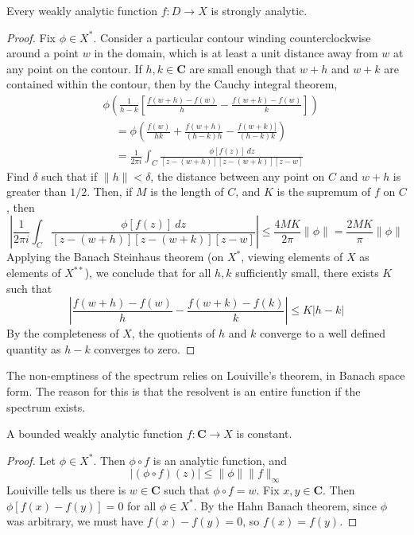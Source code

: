 \begin{theorem}
    Every weakly analytic function $f: D \to X$ is strongly analytic.
\end{theorem}
\begin{proof}
    Fix $\phi \in X^*$. Consider a particular contour winding counterclockwise around a point $w$ in the domain, which is at least a unit distance away from $w$ at any point on the contour. If $h,k \in \mathbf{C}$ are small enough that $w + h$ and $w + k$ are contained within the contour, then by the Cauchy integral theorem,
    \begin{align*}
        &\phi\left( \frac{1}{h-k} \left[ \frac{f(w + h) - f(w)}{h} - \frac{f(w + k) - f(w)}{k} \right] \right)\\
        &\ \ \ \ \ =  \phi \left( \frac{f(w)}{hk} + \frac{f(w + h)}{(h - k)h} - \frac{f(w + k)]}{(h - k)k} \right)\\
        &\ \ \ \ \ = \frac{1}{2\pi i} \int_C \frac{\phi[f(z)]\ dz}{[z - (w + h)][z - (w + k)][z - w]}
    \end{align*}
    Find $\delta$ such that if $\| h \| < \delta$, the distance between any point on $C$ and $w + h$ is greater than $1/2$. Then, if $M$ is the length of $C$, and $K$ is the supremum of $f$ on $C$, then
    \[ \left| \frac{1}{2\pi i} \int_C \frac{\phi[f(z)]\ dz}{[z - (w + h)][z - (w + k)][z - w]}\right| \leq \frac{4MK}{2 \pi} \| \phi \| = \frac{2MK}{\pi} \| \phi \| \]
    Applying the Banach Steinhaus theorem (on $X^*$, viewing elements of $X$ as elements of $X^{**}$), we conclude that for all $h,k$ sufficiently small, there exists $K$ such that
    \[ \left| \frac{f(w + h) - f(w)}{h} - \frac{f(w + k) - f(k)}{k} \right| \leq K |h - k| \]
    By the completeness of $X$, the quotients of $h$ and $k$ converge to a well defined quantity as $h - k$ converges to zero.
\end{proof}

The non-emptiness of the spectrum relies on Louiville's theorem, in Banach space form. The reason for this is that the resolvent is an entire function if the spectrum exists.

\begin{theorem}
    A bounded weakly analytic function $f: \mathbf{C} \to X$ is constant.
\end{theorem}
\begin{proof}
    Let $\phi \in X^*$. Then $\phi \circ f$ is an analytic function, and
    \[ | (\phi \circ f)(z) | \leq \| \phi \| \| f \|_\infty \]
    Louiville tells us there is $w \in \mathbf{C}$ such that $\phi \circ f = w$. Fix $x,y \in \mathbf{C}$. Then $\phi[f(x) - f(y)] = 0$ for all $\phi \in X^*$. By the Hahn Banach theorem, since $\phi$ was arbitrary, we must have $f(x) - f(y) = 0$, so $f(x) = f(y)$.
\end{proof}

